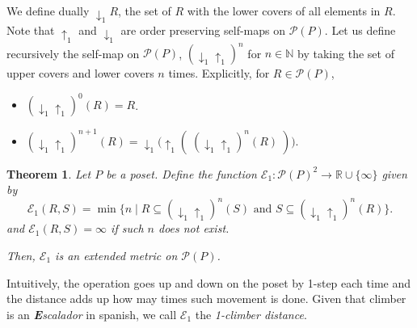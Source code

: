 \documentclass{article}[12pt]
\theoremstyle{exampstyle}
\newtheorem{theorem}{Theorem}[section]
\theoremstyle{remark}
\newcommand{\N}{\mathbb{N}}
\newcommand{\R}{\mathbb{R}}
\newcommand{\E}{\mathcal{E}}
\renewcommand{\P}{\mathcal{P}}
\newcommand{\updown}[1][]{\downarrow_{#1} \uparrow_{#1}}
\begin{document}
We define dually $\downarrow_1 R$, the set of $R$ with the lower covers of all elements in $R$. Note that $\uparrow_1$ and $\downarrow_1$ are order preserving self-maps on $\P(P)$. Let us define recursively the self-map on $\P(P)$, $(\updown[1])^{n}$ for $n \in \N$ by taking the set of upper covers and lower covers $n$ times. Explicitly, for $R \in \P(P)$,
\begin{itemize}
    \item $(\updown[1])^0 (R) = R$.
    \item $(\updown[1])^{n+1} (R) = \downarrow_1 \big( \uparrow_1 ( \; (\updown[1])^{n} (R) \;) \big)$.
\end{itemize}

\begin{theorem}
        Let $P$ be a poset. Define the function $\E_1: \P(P)^ 2 \to \R \cup \{ \infty\}$ given by 
            \begin{equation*}
                \E_1(R,S) = \min \{ n \mid R \subseteq (\updown[1])^{n} (S) \text{ and } S \subseteq (\updown[1])^{n} (R)\}.
            \end{equation*}
            and $\E_1(R,S) = \infty$ if such $n$ does not exist.

        Then, $\E_1$ is an extended metric on $\P(P)$.
    \label{th:E1_is_distance}
\end{theorem}

Intuitively, the operation goes up and down on the poset by 1-step each time and the distance adds up how may times such movement is done. Given that climber is an \textit{\textbf{E}scalador} in spanish, we call $\E_1$ the \textit{1-climber distance}. 
\end{document}
